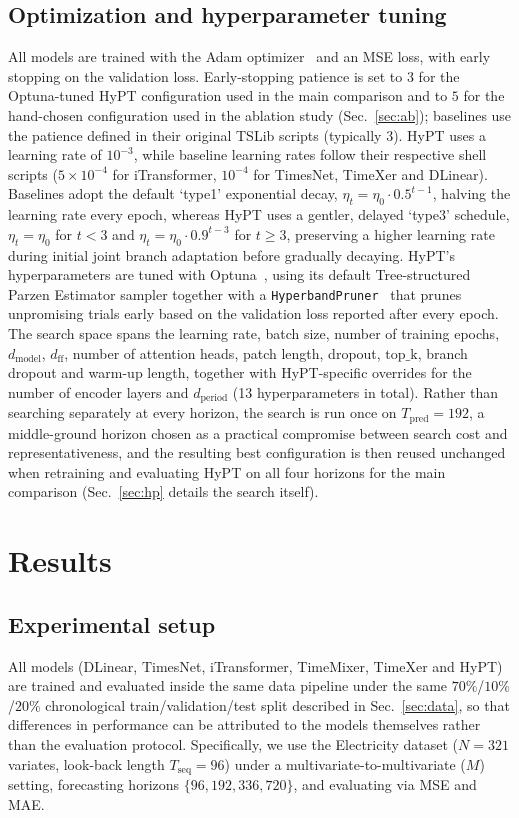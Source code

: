 \documentclass[10pt,journal]{IEEEtran}
\newcommand{\secref}[1]{Sec.~\ref{#1}}
\begin{document}
\subsection{Optimization and hyperparameter tuning}
\label{sec:optimization}
All models are trained with the Adam optimizer~\cite{adam} and an MSE loss, with early stopping on the validation loss. Early-stopping patience is set to $3$ for the Optuna-tuned HyPT configuration used in the main comparison and to $5$ for the hand-chosen configuration used in the ablation study (\secref{sec:ab}); baselines use the patience defined in their original TSLib scripts (typically $3$). HyPT uses a learning rate of $10^{-3}$, while baseline learning rates follow their respective shell scripts ($5\!\times\!10^{-4}$ for iTransformer, $10^{-4}$ for TimesNet, TimeXer and DLinear). Baselines adopt the default `type1' exponential decay, $\eta_t = \eta_0 \cdot 0.5^{t-1}$, halving the learning rate every epoch, whereas HyPT uses a gentler, delayed `type3' schedule, $\eta_t = \eta_0$ for $t < 3$ and $\eta_t = \eta_0 \cdot 0.9^{t-3}$ for $t \geq 3$, preserving a higher learning rate during initial joint branch adaptation before gradually decaying. HyPT's hyperparameters are tuned with Optuna~\cite{optuna}, using its default Tree-structured Parzen Estimator sampler together with a \texttt{HyperbandPruner}~\cite{shp} that prunes unpromising trials early based on the validation loss reported after every epoch. The search space spans the learning rate, batch size, number of training epochs, $d_{\mathrm{model}}$, $d_{\mathrm{ff}}$, number of attention heads, patch length, dropout, $\mathrm{top\_k}$, branch dropout and warm-up length, together with HyPT-specific overrides for the number of encoder layers and $d_{\mathrm{period}}$ (13 hyperparameters in total). Rather than searching separately at every horizon, the search is run once on $T_{\mathrm{pred}} = 192$, a middle-ground horizon chosen as a practical compromise between search cost and representativeness, and the resulting best configuration is then reused unchanged when retraining and evaluating HyPT on all four horizons for the main comparison (\secref{sec:hp} details the search itself).


\section{Results}
\label{sec:results}

\subsection{Experimental setup}
All models (DLinear, TimesNet, iTransformer, TimeMixer, TimeXer and HyPT) are trained and evaluated inside the same data pipeline under the same $70\%$/$10\%$/$20\%$ chronological train/validation/test split described in \secref{sec:data}, so that differences in performance can be attributed to the models themselves rather than the evaluation protocol. Specifically, we use the Electricity dataset ($N=321$ variates, look-back length $T_{\mathrm{seq}} = 96$) under a multivariate-to-multivariate ($M$) setting, forecasting horizons $\{96, 192, 336, 720\}$, and evaluating via MSE and MAE.
\end{document}
